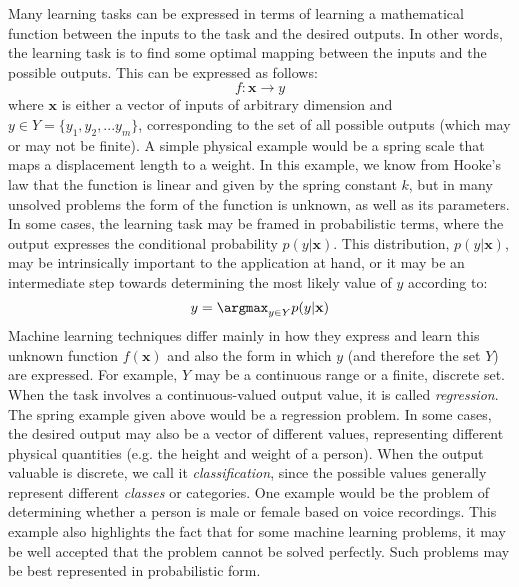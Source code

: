Many learning tasks can be expressed in terms of learning a mathematical function between the inputs to the task and the desired outputs. In other words, the learning task is to find some optimal mapping between the inputs and the possible outputs. This can be expressed as follows:
%
\begin{equation}
f : \mathbf{x} \rightarrow y
\end{equation}where $\mathbf{x}$ is either a vector of inputs of arbitrary dimension and $y \in Y=\{y_1, y_2,...y_m\}$, corresponding to the set of all possible outputs (which may or may not be finite). A simple physical example would be a spring scale that maps a displacement length to a weight. In this example, we know from Hooke's law that the function is linear and given by the spring constant $k$, but in many unsolved problems the form of the function is unknown, as well as its parameters. In some cases, the learning task may be framed in probabilistic terms, where the output expresses the conditional probability $p(y|\mathbf{x})$. This distribution, $p(y|\mathbf{x})$, may be intrinsically important to the application at hand, or it may be an intermediate step towards determining the most likely value of $y$ according to:
%
\begin{equation}
y = \argmax_{y \in Y} p (y|\mathbf{x})
\end{equation}
%
Machine learning techniques differ mainly in how they express and learn this unknown function $f(\mathbf{x})$ and also the form in which $y$ (and therefore the set $Y$) are expressed. For example, $Y$ may be a continuous range or a finite, discrete set. When the task involves a continuous-valued output value, it is called \emph{regression}. The spring example given above would be a regression problem. In some cases, the desired output may also be a vector of different values, representing different physical quantities (e.g. the height and weight of a person). When the output valuable is discrete, we call it \emph{classification}, since the possible values generally represent different \emph{classes} or categories. One example would be the problem of determining whether a person is male or female based on voice recordings. This example also highlights the fact that for some machine learning problems, it may be well accepted that the problem cannot be solved perfectly. Such problems may be best represented in probabilistic form.

